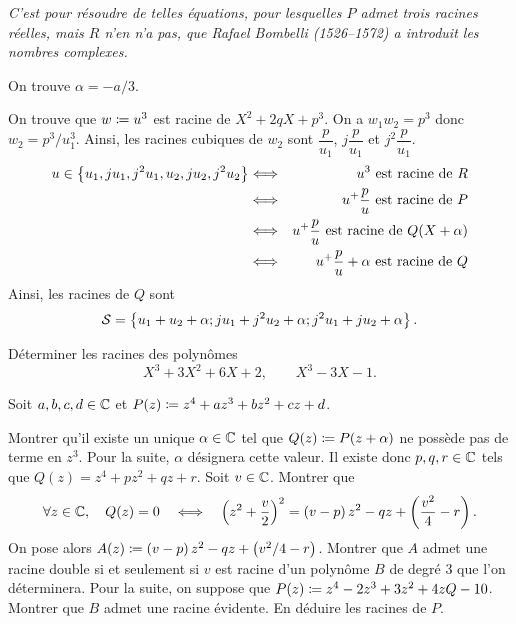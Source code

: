\documentclass{magnolia}
\begin{document}
\textit{C'est pour résoudre de telles équations, pour lesquelles $P$ admet trois racines réelles, mais $R$ n'en n'a pas, que {\sc Rafael Bombelli} (1526--1572) a introduit les nombres complexes.}

\begin{sol}
\begin{questions}
\question On trouve $\alpha=-a/3$.
\question 
\begin{questions}
\question On trouve que $w\coloneqq u^3$ est racine de $X^2+2qX+p^3$.
\question On a $w_1w_2=p^3$ donc $w_2=p^3/u_1^3$. Ainsi, les racines cubiques de $w_2$ sont $\dfrac{p}{u_1}$, $j\dfrac{p}{u_1}$ et $j^2\dfrac{p}{u_1}$. 
\question 
\begin{eqnarray*}
u\in\left\{u_1,ju_1,j^2u_1,u_2,ju_2,j^2u_2\right\} &\Longleftrightarrow& u^3 \text{ est racine de } R \\
&\Longleftrightarrow& u^+\dfrac{p}{u} \text{ est racine de } P\\
&\Longleftrightarrow& u^+\dfrac{p}{u} \text{ est racine de } Q(X+\alpha)\\
&\Longleftrightarrow& u^+\dfrac{p}{u}+\alpha \text{ est racine de } Q
\end{eqnarray*}
Ainsi, les racines de $Q$ sont $$\mathcal{S}=\left\{u_1+u_2+\alpha; ju_1+j^2u_2+\alpha; j^2u_1+ju_2+\alpha\right\}.$$
\end{questions} 
\question Déterminer les racines des polynômes
  \[X^3+3X^2+6X+2,\qquad X^3-3X-1.\]
\end{questions}
\end{sol}

Soit $a,b,c,d\in\mathbb{C}$ et $P(z)\coloneqq z^4+az^3+bz^2+cz+d$. 
\begin{questions}
\question Montrer qu'il existe un unique $\alpha\in\mathbb{C}$ tel que $Q(z)\coloneqq P(z+\alpha)$ ne possède pas de terme en $z^3$.
\enonce Pour la suite, $\alpha$ désignera cette valeur. Il existe donc $p,q,r\in\mathbb{C}$ tels que $Q(z)=z^4+p z^2+q z+ r$.
\question Soit $v\in\mathbb{C}$. Montrer que
  \[\forall z\in\mathbb{C},\quad Q(z)=0 \quad\Longleftrightarrow\quad \left(z^2+\frac{v}{2}\right)^2=\left(v-p\right)z^2-qz+\left(\frac{v^2}{4}-r\right).\]
  On pose alors $A(z)\coloneqq \left(v-p\right)z^2-qz+\left(v^2/4-r\right)$.
\question Montrer que $A$ admet une racine double si et seulement si $v$ est racine d'un polynôme $B$ de degré 3 que l'on déterminera.
\enonce Pour la suite, on suppose que $P(z)\coloneqq z^4-2z^3+3z^2+4zQ-10$.
\question Montrer que $B$ admet une racine évidente. En déduire les racines de $P$.
\end{questions}
\end{document}

